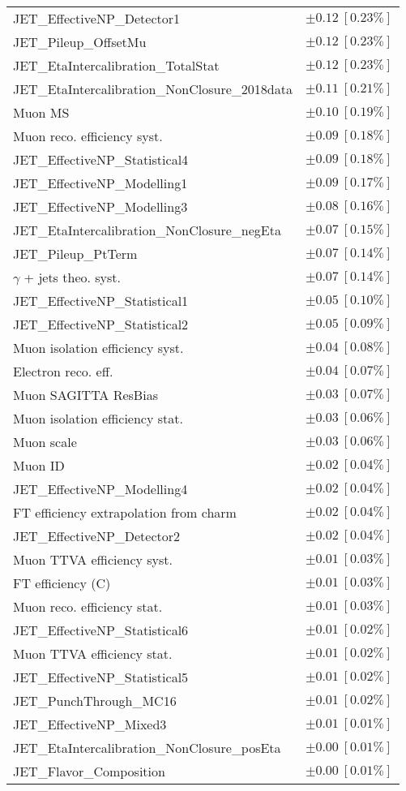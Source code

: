 \begin{tabular}{lr}
JET\_EffectiveNP\_Detector1 & $\pm 0.12\ [0.23\%]$ \\
JET\_Pileup\_OffsetMu & $\pm 0.12\ [0.23\%]$ \\
JET\_EtaIntercalibration\_TotalStat & $\pm 0.12\ [0.23\%]$ \\
JET\_EtaIntercalibration\_NonClosure\_2018data & $\pm 0.11\ [0.21\%]$ \\
Muon MS & $\pm 0.10\ [0.19\%]$ \\
Muon reco. efficiency syst. & $\pm 0.09\ [0.18\%]$ \\
JET\_EffectiveNP\_Statistical4 & $\pm 0.09\ [0.18\%]$ \\
JET\_EffectiveNP\_Modelling1 & $\pm 0.09\ [0.17\%]$ \\
JET\_EffectiveNP\_Modelling3 & $\pm 0.08\ [0.16\%]$ \\
JET\_EtaIntercalibration\_NonClosure\_negEta & $\pm 0.07\ [0.15\%]$ \\
JET\_Pileup\_PtTerm & $\pm 0.07\ [0.14\%]$ \\
$\gamma$ + jets theo. syst. & $\pm 0.07\ [0.14\%]$ \\
JET\_EffectiveNP\_Statistical1 & $\pm 0.05\ [0.10\%]$ \\
JET\_EffectiveNP\_Statistical2 & $\pm 0.05\ [0.09\%]$ \\
Muon isolation efficiency syst. & $\pm 0.04\ [0.08\%]$ \\
Electron reco. eff. & $\pm 0.04\ [0.07\%]$ \\
Muon SAGITTA ResBias & $\pm 0.03\ [0.07\%]$ \\
Muon isolation efficiency stat. & $\pm 0.03\ [0.06\%]$ \\
Muon scale & $\pm 0.03\ [0.06\%]$ \\
Muon ID & $\pm 0.02\ [0.04\%]$ \\
JET\_EffectiveNP\_Modelling4 & $\pm 0.02\ [0.04\%]$ \\
FT efficiency extrapolation from charm & $\pm 0.02\ [0.04\%]$ \\
JET\_EffectiveNP\_Detector2 & $\pm 0.02\ [0.04\%]$ \\
Muon TTVA efficiency syst. & $\pm 0.01\ [0.03\%]$ \\
FT efficiency (C) & $\pm 0.01\ [0.03\%]$ \\
Muon reco. efficiency stat. & $\pm 0.01\ [0.03\%]$ \\
JET\_EffectiveNP\_Statistical6 & $\pm 0.01\ [0.02\%]$ \\
Muon TTVA efficiency stat. & $\pm 0.01\ [0.02\%]$ \\
JET\_EffectiveNP\_Statistical5 & $\pm 0.01\ [0.02\%]$ \\
JET\_PunchThrough\_MC16 & $\pm 0.01\ [0.02\%]$ \\
JET\_EffectiveNP\_Mixed3 & $\pm 0.01\ [0.01\%]$ \\
JET\_EtaIntercalibration\_NonClosure\_posEta & $\pm 0.00\ [0.01\%]$ \\
JET\_Flavor\_Composition & $\pm 0.00\ [0.01\%]$ \\
\hline
\end{tabular}
